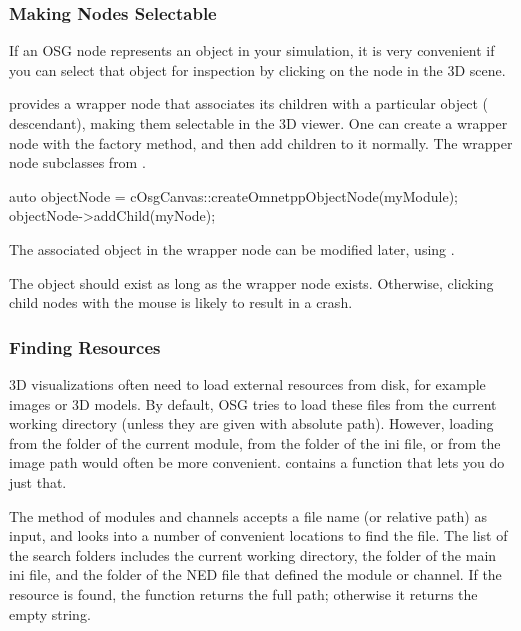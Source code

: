 \subsubsection{Making Nodes Selectable}

If an OSG node represents an object in your simulation, it is very convenient
if you can select that object for inspection by clicking on the node in the 3D scene.

{\opp} provides a wrapper node that associates its children with a particular {\opp}
object ( descendant), making them selectable in the 3D viewer.
One can create a wrapper node with the 
factory method, and then add children to it normally. The wrapper node subclasses
from .

\begin{cpp}
auto objectNode = cOsgCanvas::createOmnetppObjectNode(myModule);
objectNode->addChild(myNode);
\end{cpp}

The associated {\opp} object in the wrapper node can be modified later, using
.

\begin{note}
The {\opp} object should exist as long as the wrapper node exists. Otherwise,
clicking child nodes with the mouse is likely to result in a crash.
\end{note}

\subsubsection{Finding Resources}

3D visualizations often need to load external resources from disk, for
example images or 3D models. By default, OSG tries to load these files
from the current working directory (unless they are given with absolute path).
However, loading from the folder of the current {\opp} module, from the folder
of the ini file, or from the image path would often be more convenient.
{\opp} contains a function that lets you do just that.

The  method of modules and channels accepts a
file name (or relative path) as input, and looks into a number of convenient
locations to find the file. The list of the search folders includes
the current working directory, the folder of the main ini file, and the folder
of the NED file that defined the module or channel.
If the resource is found, the function returns the full path; otherwise
it returns the empty string.

